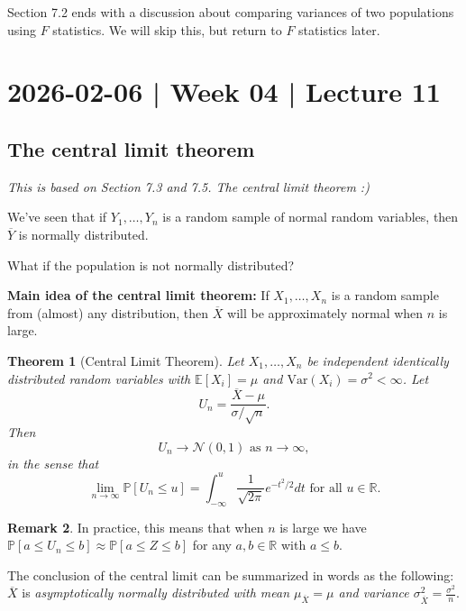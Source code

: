 \documentclass[10pt]{article}
\newtheorem{theorem}{Theorem}
\theoremstyle{definition}
\newtheorem{remark}[theorem]{Remark}
\newcommand{\vt}{\vskip 5mm} %
\newcommand{\Fl}{\vt\noindent\textbf} %
\newcommand{\1}[1]{\textbf{1}_{\left[#1\right]}} %
\def\R{\mathbb{R}} %
\def\E{\mathbb{E}} %
\def\P{\mathbb{P}} %
\def\Var{\mathrm{Var}} %
\begin{document}
Section 7.2 ends with a discussion about comparing variances of two
populations using $F$ statistics. We will skip this, but return to $F$
statistics later.

\newpage

\section{2026-02-06 | Week 04 | Lecture 11}
\subsection{The central limit theorem}

\textit{This is based on Section 7.3 and 7.5. The central limit theorem :)}


We've seen that if $Y_{1},\ldots,Y_{n}$ is a random sample of normal random
variables, then $\overline{Y}$ is normally distributed.

What if the population is not normally distributed?

\Fl{Main idea of the central limit theorem:} If  $X_{1},\ldots,X_{n}$ is a
random sample from (almost) any distribution, then $\overline{X}$ will be
approximately normal when $n$ is large.



\begin{theorem}[Central Limit Theorem]
  \label{thm:central-limit-theorem}
  Let $X_{1},\ldots,X_{n}$ be independent identically distributed random
  variables with $\E\left[X_{i} \right]=\mu$ and $\Var(X_{i}) =
  \sigma^{2}<\infty$. Let
  \begin{equation*}
    U_{n} = \frac{\overline{X}-\mu}{\sigma/ \sqrt{n}}.
  \end{equation*}
  Then
  \begin{equation*}
    U_{n} \to \mathcal{N}(0,1) \text{ as } n \to \infty,
  \end{equation*}
  in the sense that
  \begin{equation*}
    \lim_{n\to \infty}\P\left[U_{n}\leq u\right] =
    \int_{-\infty}^{u}\frac{1}{\sqrt{2\pi}}e^{-t^{2}/2}dt \text{ for all $u\in \R$.}
  \end{equation*}
\end{theorem}
\begin{remark}
  In practice, this means that when $n$ is large we have $\P\left[a \leq U_{n} \leq b\right] \approx \P\left[a \leq Z \leq b\right]$
  for any $a,b\in \R$ with $a \leq b$.
  

  The conclusion of the central limit can be summarized in words as the following: $\overline{X}$ is
  \textit{asymptotically normally distributed with mean
    $\mu_{\overline{X}}=\mu$ and variance
    $\sigma^{2}_{\overline{X}}=\frac{\sigma^{2}}{n}$}.

\end{remark}
\end{document}
